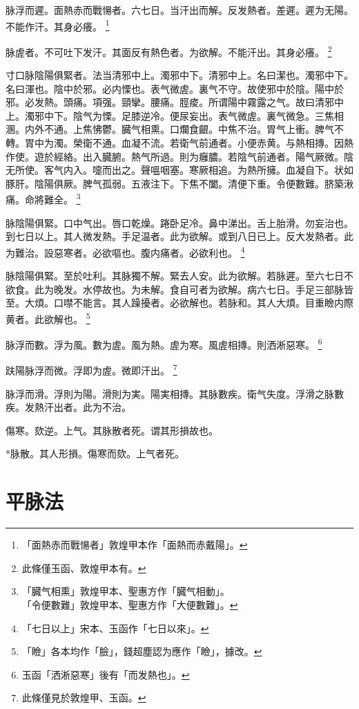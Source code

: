 脉浮而遲。面熱赤而戰愓者。六七日。当汗出而解。反发熱者。差遲。遲为无陽。不能作汗。其身必癢。
	\footnote{「面熱赤而戰愓者」敦煌甲本作「面熱而赤戴陽」。}

脉虗者。不可吐下发汗。其面反有熱色者。为欲解。不能汗出。其身必癢。
	\footnote{此條僅玉函、敦煌甲本有。}

寸口脉陰陽俱緊者。法当清邪中上。濁邪中下。清邪中上。名曰潔也。濁邪中下。名曰渾也。陰中於邪。必内慄也。表气微虗。裏气不守。故使邪中於陰。陽中於邪。必发熱。頭痛。項强。頸攣。腰痛。脛痠。所谓陽中霧露之气。故曰清邪中上。濁邪中下。陰气为慄。足膝逆冷。便尿妄出。表气微虗。裏气微急。三焦相溷。内外不通。上焦怫鬱。臓气相熏。口爛食齦。中焦不治。胃气上衝。脾气不轉。胃中为濁。榮衛不通。血凝不流。若衛气前通者。小便赤黄。与熱相摶。因熱作使。遊於經絡。出入臓腑。熱气所過。則为癰膿。若陰气前通者。陽气厥微。陰无所使。客气内入。嚏而出之。聲嗢咽塞。寒厥相追。为熱所擁。血凝自下。状如豚肝。陰陽俱厥。脾气孤弱。五液注下。下焦不闔。清便下重。令便數難。脐築湫痛。命將難全。
	\footnote{「臓气相熏」敦煌甲本、聖惠方作「臓气相動」。\\「令便數難」敦煌甲本、聖惠方作「大便數難」。}

脉陰陽俱緊。口中气出。唇口乾燥。踡卧足冷。鼻中涕出。舌上胎滑。勿妄治也。到七日以上。其人微发熱。手足温者。此为欲解。或到八日已上。反大发熱者。此为難治。設惡寒者。必欲嘔也。腹内痛者。必欲利也。
	\footnote{「七日以上」宋本、玉函作「七日以來」。}

脉陰陽俱緊。至於吐利。其脉獨不解。緊去人安。此为欲解。若脉遲。至六七日不欲食。此为晚发。水停故也。为未解。食自可者为欲解。病六七日。手足三部脉皆至。大煩。口噤不能言。其人躁擾者。必欲解也。若脉和。其人大煩。目重瞼内際黄者。此欲解也。
	\footnote{「瞼」各本均作「臉」，錢超塵認为應作「瞼」，據改。}

脉浮而數。浮为風。數为虗。風为熱。虗为寒。風虗相摶。則洒淅惡寒。
	\footnote{玉函「洒淅惡寒」後有「而发熱也」。}

趺陽脉浮而微。浮即为虗。微即汗出。
	\footnote{此條僅見於敦煌甲、玉函。}

脉浮而滑。浮{\khaaitp 則}为陽。滑{\khaaitp 則}为実。陽実相摶。其脉數疾。衛气失度。浮滑之脉數疾。发熱汗出者。此为不治。

傷寒。欬逆。上气。其脉散者死。谓其形損故也。

*脉散。其人形損。傷寒而欬。上气者死。

\chapter{平脉法}


